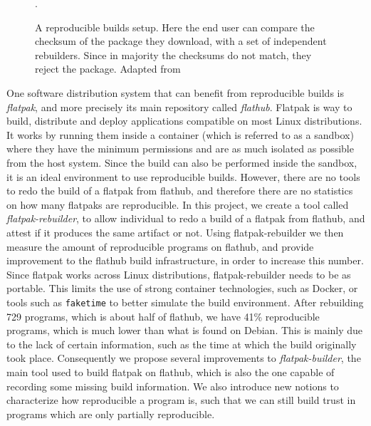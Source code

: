\documentclass[a4paper,11pt,oneside]{report}
\theoremstyle{definition}
\newcommand{\sysname}{flatpak-rebuilder\xspace}
\newcommand{\rb}{reproducible builds\xspace}
\newcommand{\fp}{flatpak\xspace}
\newcommand{\Fp}{Flatpak\xspace}
\newcommand{\fh}{flathub\xspace}
\newcommand{\fb}{flatpak-builder\xspace}
\begin{document}
\begin{figure}[h]
    \caption{A reproducible builds setup. Here the end user can compare the
    checksum of the package they download, with a set of independent
    rebuilders. Since in majority the checksums do not match, they reject the
    package. Adapted from \cite{DBLP:journals/corr/abs-2104-06020}}.
    \label{fig:reprobuild}
\end{figure}

One software distribution system that can benefit from \rb is \emph{\fp}, and
more precisely its main repository called \emph{\fh}. \Fp is way to build,
distribute and deploy applications compatible on most Linux distributions. It
works by running them inside a container (which is referred to as a sandbox)
where they have the minimum permissions and are as much isolated as possible
from the host system. Since the build can also be performed inside the sandbox,
it is an ideal environment to use \rb. However, there are no tools to redo the
build of a \fp from \fh, and therefore there are no statistics on how many
flatpaks are reproducible. In this project, we create a tool called
\emph{\sysname}, to allow individual to redo a build of a \fp from \fh, and
attest if it produces the same artifact or not. Using \sysname we then measure
the amount of reproducible programs on \fh, and provide improvement to the \fh
build infrastructure, in order to increase this number. Since \fp works across
Linux distributions, \sysname needs to be as portable. This limits the use of
strong container technologies, such as Docker, or tools such as \verb|faketime|
to better simulate the build environment.
After rebuilding 729 programs, which is about half of \fh, we have 41\%
reproducible programs, which is much lower than what is found on Debian. This
is mainly due to the lack of certain information, such as the time at which the
build originally took place. Consequently we propose several improvements to
\emph{\fb}, the main tool used to build \fp on \fh, which is also the one
capable of recording some missing build information. We also introduce new
notions to characterize how reproducible a program is, such that we can still
build trust in programs which are only partially reproducible.
\end{document}
